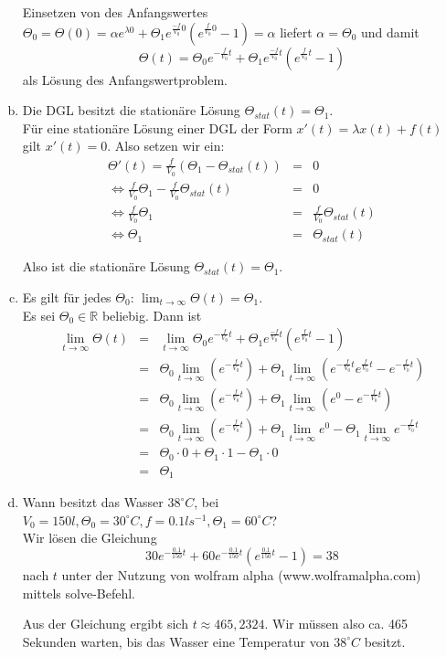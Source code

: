 \documentclass[11pt,a4paper,ngerman]{article}
\begin{document}
\begin{enumerate}[a)]
Einsetzen von des Anfangswertes 
$\Theta_0 = \Theta(0) = \alpha e^{\lambda 0} + \Theta_1  e^{\frac{-f}{V_0} 0} (e^{\frac{f}{V_0} 0} - 1) = \alpha$ liefert $\alpha = \Theta_0$ und damit
$$ \Theta(t) = \Theta_0 e^{-\frac{f}{V_0} t} + \Theta_1  e^{\frac{-f}{V_0} t} (e^{\frac{f}{V_0} t} - 1) $$
als Lösung des Anfangswertproblem.

\item Die DGL besitzt die stationäre Lösung $\Theta_{stat}(t) = \Theta_1$. \\

Für eine stationäre Lösung einer DGL der Form $x'(t) = \lambda x(t) + f(t)$ gilt $x'(t) = 0$. Also setzen wir ein:
\begin{eqnarray*}
\Theta'(t) = \frac{f}{V_0} (\Theta_1 - \Theta_{stat}(t)) &=& 0 \\
 \Leftrightarrow \frac{f}{V_0} \Theta_1 - \frac{f}{V_0} \Theta_{stat}(t) &=& 0\\
 \Leftrightarrow \frac{f}{V_0} \Theta_1 &=& \frac{f}{V_0} \Theta_{stat}(t) \\
 \Leftrightarrow \Theta_1 &=& \Theta_{stat}(t)
\end{eqnarray*}

Also ist die stationäre Lösung $\Theta_{stat}(t) = \Theta_1$.

\item Es gilt für jedes $\Theta_0$: $\lim_{t \to \infty} \Theta(t) = \Theta_1$. \\
Es sei $\Theta_0 \in \mathbb{R}$ beliebig. Dann ist
\begin{eqnarray*}
\lim_{t \to \infty} \Theta(t) &=& \lim_{t \to \infty} \Theta_0 e^{-\frac{f}{V_0} t} + \Theta_1  e^{\frac{-f}{V_0} t} (e^{\frac{f}{V_0} t} - 1) \\
&=& \Theta_0  \lim_{t \to \infty} (e^{-\frac{f}{V_0} t}) + \Theta_1 \lim_{t \to \infty} \left( e^{-\frac{f}{V_0} t}e^{\frac{f}{V_0} t} - e^{-\frac{f}{V_0} t} \right) \\
&=& \Theta_0  \lim_{t \to \infty} (e^{-\frac{f}{V_0} t}) + \Theta_1 \lim_{t \to \infty} \left(e^{0} - e^{-\frac{f}{V_0} t} \right) \\
&=& \Theta_0  \lim_{t \to \infty} (e^{-\frac{f}{V_0} t}) + \Theta_1 \lim_{t \to \infty} e^{0} - \Theta_1 \lim_{t \to \infty} e^{-\frac{f}{V_0} t}\\
&=& \Theta_0 \cdot  0 + \Theta_1 \cdot 1 - \Theta_1 \cdot 0 \\
&=& \Theta_1
\end{eqnarray*}

\item Wann besitzt das Wasser $38 ^\circ C$, bei $V_0 = 150l, \Theta_0 = 30^\circ C, f = 0.1ls^{-1}, \Theta_1 = 60 ^\circ C$? \\

Wir lösen die Gleichung
$$ 
30 e^{-\frac{0.1}{150} t} + 60 e^{-\frac{0.1}{150} t} (e^{\frac{0.1}{150} t} - 1) = 38
$$
nach $t$ unter der Nutzung von wolfram alpha (www.wolframalpha.com) mittels solve-Befehl.

Aus der Gleichung ergibt sich $t \approx 465,2324$. Wir müssen also ca. 465 Sekunden warten, bis das Wasser eine Temperatur von $38 ^\circ C$ besitzt.
\end{enumerate}
\end{document}
